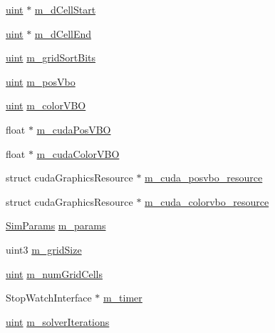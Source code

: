 \begin{DoxyCompactItemize}
\item 
\hyperlink{particles__kernel_8cuh_a91ad9478d81a7aaf2593e8d9c3d06a14}{uint} $\ast$ \hyperlink{class_particle_system_a137909a8b34f7a42e50cd0fcc86bb784}{m\-\_\-d\-Cell\-Start}
\item 
\hyperlink{particles__kernel_8cuh_a91ad9478d81a7aaf2593e8d9c3d06a14}{uint} $\ast$ \hyperlink{class_particle_system_a3a0b9c760c2bfcf811d54b8194ebea01}{m\-\_\-d\-Cell\-End}
\item 
\hyperlink{particles__kernel_8cuh_a91ad9478d81a7aaf2593e8d9c3d06a14}{uint} \hyperlink{class_particle_system_a2a0452a32993337176d88fa2fbe63020}{m\-\_\-grid\-Sort\-Bits}
\item 
\hyperlink{particles__kernel_8cuh_a91ad9478d81a7aaf2593e8d9c3d06a14}{uint} \hyperlink{class_particle_system_a31f9cccdf5dbae6f72867665bd8761e3}{m\-\_\-pos\-Vbo}
\item 
\hyperlink{particles__kernel_8cuh_a91ad9478d81a7aaf2593e8d9c3d06a14}{uint} \hyperlink{class_particle_system_a96b05c719006c9e3eaed759f54a49c7f}{m\-\_\-color\-V\-B\-O}
\item 
float $\ast$ \hyperlink{class_particle_system_aba18245745f621d90186862f1a559d9e}{m\-\_\-cuda\-Pos\-V\-B\-O}
\item 
float $\ast$ \hyperlink{class_particle_system_a39d210b57da5f7f4a2c23f4fc0b43ea1}{m\-\_\-cuda\-Color\-V\-B\-O}
\item 
struct cuda\-Graphics\-Resource $\ast$ \hyperlink{class_particle_system_a9c5de70c1705672e5722ad30dee1b14b}{m\-\_\-cuda\-\_\-posvbo\-\_\-resource}
\item 
struct cuda\-Graphics\-Resource $\ast$ \hyperlink{class_particle_system_a140043869727535abc08609b835b98fc}{m\-\_\-cuda\-\_\-colorvbo\-\_\-resource}
\item 
\hyperlink{struct_sim_params}{Sim\-Params} \hyperlink{class_particle_system_ab765472aed6a1b5f0d2f98a3a906c417}{m\-\_\-params}
\item 
uint3 \hyperlink{class_particle_system_ad555b31501a258d776e8c72c96178aa0}{m\-\_\-grid\-Size}
\item 
\hyperlink{particles__kernel_8cuh_a91ad9478d81a7aaf2593e8d9c3d06a14}{uint} \hyperlink{class_particle_system_aa1ef17d723af5d7a4685e8fd57e9ca89}{m\-\_\-num\-Grid\-Cells}
\item 
Stop\-Watch\-Interface $\ast$ \hyperlink{class_particle_system_af01e546384ef27bb1894a37f2a02e967}{m\-\_\-timer}
\item 
\hyperlink{particles__kernel_8cuh_a91ad9478d81a7aaf2593e8d9c3d06a14}{uint} \hyperlink{class_particle_system_a7b4b053433c052518b8ecce1b02000f5}{m\-\_\-solver\-Iterations}
\end{DoxyCompactItemize}


